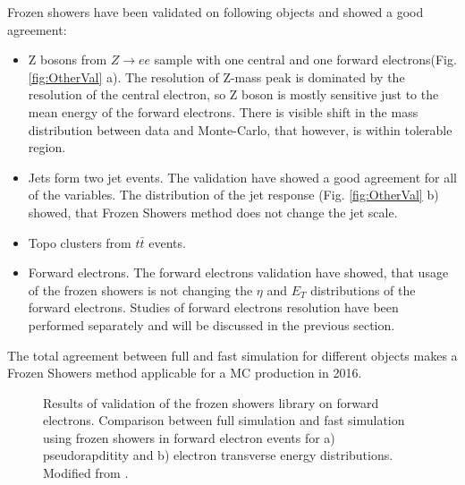 {Frozen showers have been validated on following objects and showed a good agreement:
\begin{itemize}
\item Z bosons from $Z \to ee$ sample with one central and one forward electrons(Fig. \ref{fig:OtherVal} a). The resolution of Z-mass peak is dominated by the resolution of the central electron, so Z boson is mostly sensitive just to the mean energy of the forward electrons. There is visible shift in the mass distribution between data and Monte-Carlo, that however, is within tolerable region.
\item Jets form two jet events. The validation have showed a good agreement for all of the variables. The distribution of the jet response (Fig. \ref{fig:OtherVal} b) showed, that Frozen Showers method does not change the jet scale.
\item Topo clusters from $t\bar{t}$ events. 
\item Forward electrons. The forward electrons validation have showed, that usage of the frozen showers is not changing the $\eta$ and $E_{T}$ distributions of the forward electrons. Studies of forward electrons resolution have been performed separately and will be discussed in the previous section.
\end{itemize}
The total agreement between full and fast simulation for different objects makes a Frozen Showers method applicable for a MC production in 2016.

\begin{figure}[!tbp]
\begin{minipage}[h]{0.49\linewidth}
\end{minipage}
\hfill
\begin{minipage}[h]{0.49\linewidth}
\end{minipage}
\caption{Results of validation of the frozen showers library on forward electrons. Comparison between full simulation and fast simulation using frozen showers in forward electron events  for a) pseudorapditity and b) electron transverse energy  distributions. Modified from \cite{ElecForwardVal}. }
\label{fig:OtherValFwd}
\end{figure}

}
